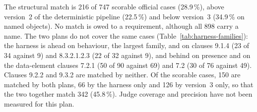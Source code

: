 The structural match is 216 of 747 scorable official cases (28.9\,\%), above
version~2 of the deterministic pipeline (22.5\,\%) and below version~3
(34.9\,\% on named objects). No match is owed to a requirement, although all
898 carry a name. The two plans do not cover the same cases
(Table~\ref{tab:harness-families}): the harness is ahead on behaviour, the
largest family, and on clauses 9.1.4 (23 of 34 against 9) and 8.3.2.1.2.3
(22 of 32 against 9), and behind
on presence and on the data-element clauses 7.2.1 (50 of 90 against 69) and
7.2 (30 of 76 against 49). Clauses 9.2.2 and 9.3.2 are matched by neither.
Of the scorable cases, 150 are matched by both plans, 66 by the harness only
and 126 by version~3 only, so that the two together match 342 (45.8\,\%).
Judge coverage and precision have not been measured for this plan.

